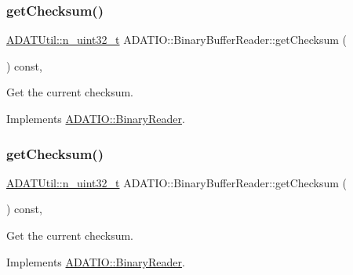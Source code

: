 \subsubsection{\texorpdfstring{getChecksum()}{getChecksum()}\hspace{0.1cm}{\footnotesize\ttfamily [2/3]}}
{\footnotesize\ttfamily \mbox{\hyperlink{namespaceADATUtil_ad945a8afa4db2d1f89b731964adae97e}{A\+D\+A\+T\+Util\+::n\+\_\+uint32\+\_\+t}} A\+D\+A\+T\+I\+O\+::\+Binary\+Buffer\+Reader\+::get\+Checksum (\begin{DoxyParamCaption}{ }\end{DoxyParamCaption}) const\hspace{0.3cm}{\ttfamily [inline]}, {\ttfamily [virtual]}}



Get the current checksum. 



Implements \mbox{\hyperlink{classADATIO_1_1BinaryReader_acd705bb96d557a5437410b55beb40bda}{A\+D\+A\+T\+I\+O\+::\+Binary\+Reader}}.

\mbox{\label{classADATIO_1_1BinaryBufferReader_ae8e6c22be76223f5e2ce2613e70be4bf}} 
\subsubsection{\texorpdfstring{getChecksum()}{getChecksum()}\hspace{0.1cm}{\footnotesize\ttfamily [3/3]}}
{\footnotesize\ttfamily \mbox{\hyperlink{namespaceADATUtil_ad945a8afa4db2d1f89b731964adae97e}{A\+D\+A\+T\+Util\+::n\+\_\+uint32\+\_\+t}} A\+D\+A\+T\+I\+O\+::\+Binary\+Buffer\+Reader\+::get\+Checksum (\begin{DoxyParamCaption}{ }\end{DoxyParamCaption}) const\hspace{0.3cm}{\ttfamily [inline]}, {\ttfamily [virtual]}}



Get the current checksum. 



Implements \mbox{\hyperlink{classADATIO_1_1BinaryReader_acd705bb96d557a5437410b55beb40bda}{A\+D\+A\+T\+I\+O\+::\+Binary\+Reader}}.

\mbox{\label{classADATIO_1_1BinaryBufferReader_a32d746446a4c990f3c592a32753d7207}} 
